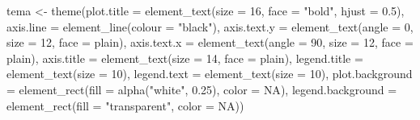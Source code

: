 \documentclass[
  letterpaper,
  DIV=11,
  numbers=noendperiod]{scrartcl}
\newenvironment{Shaded}{\begin{snugshade}}{\end{snugshade}}
\newcommand{\AttributeTok}[1]{\textcolor[rgb]{0.40,0.45,0.13}{#1}}
\newcommand{\ConstantTok}[1]{\textcolor[rgb]{0.56,0.35,0.01}{#1}}
\newcommand{\DecValTok}[1]{\textcolor[rgb]{0.68,0.00,0.00}{#1}}
\newcommand{\FloatTok}[1]{\textcolor[rgb]{0.68,0.00,0.00}{#1}}
\newcommand{\FunctionTok}[1]{\textcolor[rgb]{0.28,0.35,0.67}{#1}}
\newcommand{\NormalTok}[1]{\textcolor[rgb]{0.00,0.23,0.31}{#1}}
\newcommand{\OtherTok}[1]{\textcolor[rgb]{0.00,0.23,0.31}{#1}}
\newcommand{\StringTok}[1]{\textcolor[rgb]{0.13,0.47,0.30}{#1}}
\begin{document}
\begin{Shaded}
\begin{Highlighting}[]
\NormalTok{tema }\OtherTok{\textless{}{-}} \FunctionTok{theme}\NormalTok{(}\AttributeTok{plot.title =} \FunctionTok{element\_text}\NormalTok{(}\AttributeTok{size =} \DecValTok{16}\NormalTok{, }\AttributeTok{face =} \StringTok{"bold"}\NormalTok{, }\AttributeTok{hjust =} \FloatTok{0.5}\NormalTok{),}
              \AttributeTok{axis.line =} \FunctionTok{element\_line}\NormalTok{(}\AttributeTok{colour =} \StringTok{"black"}\NormalTok{),}
              \AttributeTok{axis.text.y =} \FunctionTok{element\_text}\NormalTok{(}\AttributeTok{angle =} \DecValTok{0}\NormalTok{, }\AttributeTok{size =} \DecValTok{12}\NormalTok{, }\AttributeTok{face =} \StringTok{\textquotesingle{}plain\textquotesingle{}}\NormalTok{),}
              \AttributeTok{axis.text.x =} \FunctionTok{element\_text}\NormalTok{(}\AttributeTok{angle =} \DecValTok{90}\NormalTok{, }\AttributeTok{size =} \DecValTok{12}\NormalTok{, }\AttributeTok{face =} \StringTok{\textquotesingle{}plain\textquotesingle{}}\NormalTok{),}
              \AttributeTok{axis.title =} \FunctionTok{element\_text}\NormalTok{(}\AttributeTok{size =} \DecValTok{14}\NormalTok{, }\AttributeTok{face =} \StringTok{\textquotesingle{}plain\textquotesingle{}}\NormalTok{),}
              \AttributeTok{legend.title =} \FunctionTok{element\_text}\NormalTok{(}\AttributeTok{size =} \DecValTok{10}\NormalTok{),}
              \AttributeTok{legend.text =} \FunctionTok{element\_text}\NormalTok{(}\AttributeTok{size =} \DecValTok{10}\NormalTok{),}
              \AttributeTok{plot.background =} \FunctionTok{element\_rect}\NormalTok{(}\AttributeTok{fill =} \FunctionTok{alpha}\NormalTok{(}\StringTok{"white"}\NormalTok{, }\FloatTok{0.25}\NormalTok{), }
                                       \AttributeTok{color =} \ConstantTok{NA}\NormalTok{),}
              \AttributeTok{legend.background =} \FunctionTok{element\_rect}\NormalTok{(}\AttributeTok{fill =} \StringTok{"transparent"}\NormalTok{, }\AttributeTok{color =} \ConstantTok{NA}\NormalTok{))}


\end{Highlighting}
\end{Shaded}
\end{document}
